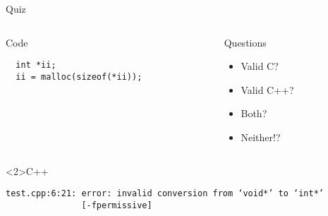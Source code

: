 \documentclass[presentation,aspectratio=169]{beamer}
\begin{document}
\begin{frame}[fragile,label={sec:org23c4234}]{Quiz}
\begin{columns}
\begin{column}{0.48\columnwidth}
\begin{block}{Code}
\begin{verbatim}
  int *ii;
  ii = malloc(sizeof(*ii));
\end{verbatim}
\end{block}
\end{column}

\begin{column}{0.48\columnwidth}
\begin{block}{Questions}
\begin{itemize}
\item Valid C?
\item Valid C++?
\item Both?
\item Neither!?
\end{itemize}
\end{block}
\end{column}
\end{columns}

\begin{block}<2>{C++}
\begin{verbatim}
test.cpp:6:21: error: invalid conversion from ‘void*’ to ‘int*’
               [-fpermissive]
\end{verbatim}
\end{block}
\end{frame}

\end{document}
